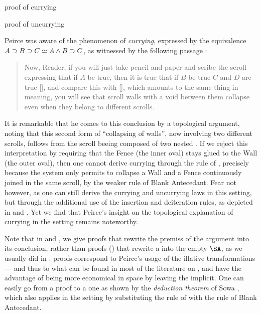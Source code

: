 \begin{scope}
\begin{marginfigure}[0em]
  
  \caption{ proof of currying}
\end{marginfigure}

\begin{marginfigure}[27em]
  
  \caption{ proof of uncurrying}
\end{marginfigure}

Peirce was aware of the phenomenon of \emph{currying}, expressed  by
the equivalence $A \supset B \supset C \simeq A \land B \supset C$, as witnessed by
the following passage \cite[p.~535]{peirce_prolegomena_1906}:
\begin{quote}
Now, Reader, if you will just take pencil and paper and scribe the scroll
expressing that if $A$ be true, then it is true that if $B$ be true $C$ and $D$
are true [], and compare this with [],
which amounts to the same thing in meaning, you will see that scroll walls with
a void between them collapse even when they belong to different scrolls.
\end{quote}
It is remarkable that he comes to this conclusion by a topological argument,
noting that this second form of ``collapsing of walls'', now involving two
different scrolls, follows from the scroll beeing composed of two nested
. If we reject this interpretation by requiring that the Fence (the
inner oval) stays glued to the Wall (the outer oval), then one cannot derive
currying through the rule of , precisely because the system
only permits to collapse a Wall and a Fence continuously joined in the same
scroll, by the weaker rule of Blank Antecedant. Fear not however, as one can
still derive the currying and uncurrying laws in this  setting,
but through the additional use of the insertion and deiteration rules, as
depicted in  and . Yet we find that
Peirce's insight on the topological explanation of currying in the 
setting remains noteworthy.

\begin{remark}
Note that in  and , we give
\emph{} proofs that rewrite the premiss of the argument into its
conclusion, rather than \emph{} proofs () that rewrite
a  into the empty $\SA$, as we usually did in .  proofs
correspond to Peirce's usage of the illative transformations --- and thus to
what can be found in most of the literature on , and have the advantage
of being more economical in space by leaving the  implicit. One can easily
go from a  proof to a  one as shown by the \emph{deduction
theorem} of Sowa \cite[Section 6]{sowa_peirces_2011}, which also applies in the
 setting by substituting the rule of  with the rule
of Blank Antecedant.
\end{remark}


\end{scope}
